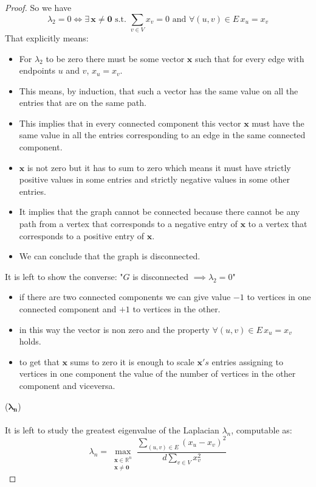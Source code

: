 \begin{theorem}
\begin{proof}
So we have 
\[\lambda_2 = 0 \iff \exists \, \mathbf{x} \ne \mathbf{0} \text{ s.t. } \sum_{v \in V} x_v = 0 \text{ and } \forall (u,v) \in E \, x_u = x_v \] 
That explicitly means:
\begin{itemize}
\item For $ \lambda_2 $ to be zero there must be some vector $ \mathbf{x} $ such that for every edge  with endpoints $ u $ and $ v $, $ x_u = x_v $. \\
\item This means, by induction, that such a vector has the same value on all the entries that are on the same path. \\
\item This implies that in every connected component this vector $ \mathbf{x} $ must have the same value in all the entries corresponding to an edge in the same connected component. \\
\item $ \mathbf{x} $ is not zero but it has to sum to zero which means it must have strictly positive values in some entries and strictly negative values in some other entries. \\
\item It implies that the graph cannot be connected because there cannot be any path from a vertex that corresponds to a negative entry of $ \mathbf{x} $ to a vertex that corresponds to a positive entry of $ \mathbf{x} $.\\
\item We can conclude that the graph is disconnected.
\end{itemize}
It is left to show the converse: "$ G $ is disconnected $ \implies \lambda_2 = 0 $" \\
\begin{itemize}
\item if there are two connected components we can give value $ -1 $ to vertices in one connected component and $ +1 $ to vertices in the other. \\
\item in this way the vector is non zero and the property $ \forall (u,v) \in E \, x_u = x_v  $ holds. \\
\item to get that $ \mathbf{x} $ sums to zero it is enough to scale $ \mathbf{x}'s $ entries assigning to vertices in one component the value of the number of vertices in the other component and viceversa.
\end{itemize}

($ \mathbf{\lambda_n} $)
\\
\\
It is left to study the greatest eigenvalue of the Laplacian $ \lambda_n $, computable as:
\[\lambda_n = \max_{\substack{\mathbf{x} \in \mathbb{R}^n \\ \mathbf{x} \ne \mathbf{0}}} \frac{\sum_{(u,v)\in E}(x_u-x_v)^2}{d \sum_{v \in V} x_v^2 } \]


\end{proof}
\end{theorem}
